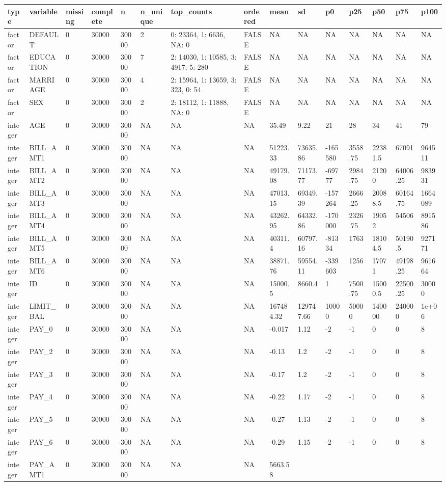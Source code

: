 \documentclass[]{article}
\begin{document}
\begin{longtable}[]{@{}lllllllllllllll@{}}
\toprule
type & variable & missing & complete & n & n\_unique & top\_counts &
ordered & mean & sd & p0 & p25 & p50 & p75 & p100\tabularnewline
\midrule
\endhead
factor & DEFAULT & 0 & 30000 & 30000 & 2 & 0: 23364, 1: 6636, NA: 0 &
FALSE & NA & NA & NA & NA & NA & NA & NA\tabularnewline
factor & EDUCATION & 0 & 30000 & 30000 & 7 & 2: 14030, 1: 10585, 3:
4917, 5: 280 & FALSE & NA & NA & NA & NA & NA & NA & NA\tabularnewline
factor & MARRIAGE & 0 & 30000 & 30000 & 4 & 2: 15964, 1: 13659, 3: 323,
0: 54 & FALSE & NA & NA & NA & NA & NA & NA & NA\tabularnewline
factor & SEX & 0 & 30000 & 30000 & 2 & 2: 18112, 1: 11888, NA: 0 & FALSE
& NA & NA & NA & NA & NA & NA & NA\tabularnewline
integer & AGE & 0 & 30000 & 30000 & NA & NA & NA & 35.49 & 9.22 & 21 &
28 & 34 & 41 & 79\tabularnewline
integer & BILL\_AMT1 & 0 & 30000 & 30000 & NA & NA & NA & 51223.33 &
73635.86 & -165580 & 3558.75 & 22381.5 & 67091 & 964511\tabularnewline
integer & BILL\_AMT2 & 0 & 30000 & 30000 & NA & NA & NA & 49179.08 &
71173.77 & -69777 & 2984.75 & 21200 & 64006.25 & 983931\tabularnewline
integer & BILL\_AMT3 & 0 & 30000 & 30000 & NA & NA & NA & 47013.15 &
69349.39 & -157264 & 2666.25 & 20088.5 & 60164.75 &
1664089\tabularnewline
integer & BILL\_AMT4 & 0 & 30000 & 30000 & NA & NA & NA & 43262.95 &
64332.86 & -170000 & 2326.75 & 19052 & 54506 & 891586\tabularnewline
integer & BILL\_AMT5 & 0 & 30000 & 30000 & NA & NA & NA & 40311.4 &
60797.16 & -81334 & 1763 & 18104.5 & 50190.5 & 927171\tabularnewline
integer & BILL\_AMT6 & 0 & 30000 & 30000 & NA & NA & NA & 38871.76 &
59554.11 & -339603 & 1256 & 17071 & 49198.25 & 961664\tabularnewline
integer & ID & 0 & 30000 & 30000 & NA & NA & NA & 15000.5 & 8660.4 & 1 &
7500.75 & 15000.5 & 22500.25 & 30000\tabularnewline
integer & LIMIT\_BAL & 0 & 30000 & 30000 & NA & NA & NA & 167484.32 &
129747.66 & 10000 & 50000 & 140000 & 240000 & 1e+06\tabularnewline
integer & PAY\_0 & 0 & 30000 & 30000 & NA & NA & NA & -0.017 & 1.12 & -2
& -1 & 0 & 0 & 8\tabularnewline
integer & PAY\_2 & 0 & 30000 & 30000 & NA & NA & NA & -0.13 & 1.2 & -2 &
-1 & 0 & 0 & 8\tabularnewline
integer & PAY\_3 & 0 & 30000 & 30000 & NA & NA & NA & -0.17 & 1.2 & -2 &
-1 & 0 & 0 & 8\tabularnewline
integer & PAY\_4 & 0 & 30000 & 30000 & NA & NA & NA & -0.22 & 1.17 & -2
& -1 & 0 & 0 & 8\tabularnewline
integer & PAY\_5 & 0 & 30000 & 30000 & NA & NA & NA & -0.27 & 1.13 & -2
& -1 & 0 & 0 & 8\tabularnewline
integer & PAY\_6 & 0 & 30000 & 30000 & NA & NA & NA & -0.29 & 1.15 & -2
& -1 & 0 & 0 & 8\tabularnewline
integer & PAY\_AMT1 & 0 & 30000 & 30000 & NA & NA & NA & 5663.58 &

\end{longtable}
\end{document}
